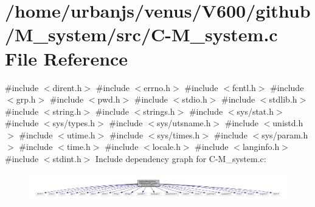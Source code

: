 \hypertarget{C-M__system_8c}{}\section{/home/urbanjs/venus/\+V600/github/\+M\+\_\+system/src/\+C-\/\+M\+\_\+system.c File Reference}
\label{C-M__system_8c}
{\ttfamily \#include $<$dirent.\+h$>$}\newline
{\ttfamily \#include $<$errno.\+h$>$}\newline
{\ttfamily \#include $<$fcntl.\+h$>$}\newline
{\ttfamily \#include $<$grp.\+h$>$}\newline
{\ttfamily \#include $<$pwd.\+h$>$}\newline
{\ttfamily \#include $<$stdio.\+h$>$}\newline
{\ttfamily \#include $<$stdlib.\+h$>$}\newline
{\ttfamily \#include $<$string.\+h$>$}\newline
{\ttfamily \#include $<$strings.\+h$>$}\newline
{\ttfamily \#include $<$sys/stat.\+h$>$}\newline
{\ttfamily \#include $<$sys/types.\+h$>$}\newline
{\ttfamily \#include $<$sys/utsname.\+h$>$}\newline
{\ttfamily \#include $<$unistd.\+h$>$}\newline
{\ttfamily \#include $<$utime.\+h$>$}\newline
{\ttfamily \#include $<$sys/times.\+h$>$}\newline
{\ttfamily \#include $<$sys/param.\+h$>$}\newline
{\ttfamily \#include $<$time.\+h$>$}\newline
{\ttfamily \#include $<$locale.\+h$>$}\newline
{\ttfamily \#include $<$langinfo.\+h$>$}\newline
{\ttfamily \#include $<$stdint.\+h$>$}\newline
Include dependency graph for C-\/\+M\+\_\+system.c\+:
\nopagebreak
\begin{figure}[H]
\begin{center}
\leavevmode
\includegraphics[width=350pt]{C-M__system_8c__incl}
\end{center}
\end{figure}

